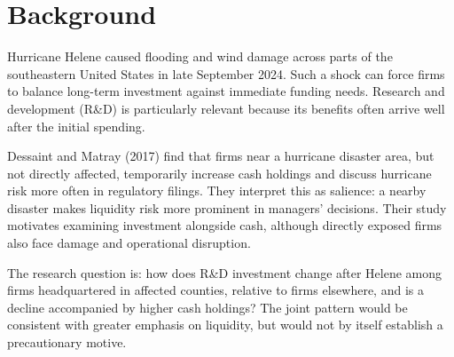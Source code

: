 \section*{Background}

Hurricane Helene caused flooding and wind damage across parts of the southeastern United States in late September 2024. Such a shock can force firms to balance long-term investment against immediate funding needs. Research and development (R\&D) is particularly relevant because its benefits often arrive well after the initial spending.

Dessaint and Matray (2017) find that firms near a hurricane disaster area, but not directly affected, temporarily increase cash holdings and discuss hurricane risk more often in regulatory filings. They interpret this as salience: a nearby disaster makes liquidity risk more prominent in managers' decisions. Their study motivates examining investment alongside cash, although directly exposed firms also face damage and operational disruption.

The research question is: how does R\&D investment change after Helene among firms headquartered in affected counties, relative to firms elsewhere, and is a decline accompanied by higher cash holdings? The joint pattern would be consistent with greater emphasis on liquidity, but would not by itself establish a precautionary motive.
